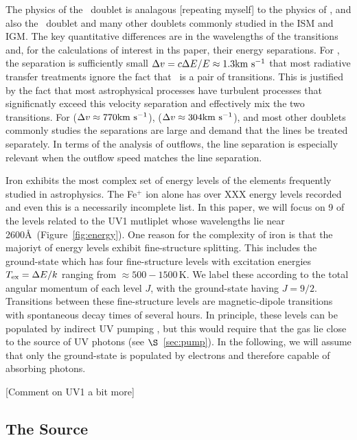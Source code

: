 \documentclass[12pt,preprint]{aastex}
\begin{document}
The physics of the \mgiid\ doublet
is analagous [repeating myself] to the physics of 
\lya, and also the \naid\ doublet and many other doublets commonly
studied in the ISM and IGM.  The key quantitative differences are in
the wavelengths of the transitions and, for the calculations of interest
in ths paper, their energy separations.  For  \lya, the
separation is sufficiently small $\Delta v = c \Delta E / E \approx 1.3
{\rm km~s^{-1}}$ that most radiative transfer treatments ignore the fact that
\lya\ is a pair of transitions.   This is justified by the fact that
most astrophysical processes have turbulent processes that
significnatly exceed this velocity separation and effectively mix the
two transitions.  For  ($\Delta v \approx 770 {\rm km~s^{-1}}$),  
 ($\Delta v \approx 304 {\rm km~s^{-1}}$), and most other doublets
commonly studies the separations are large and demand that the lines
be treated separately.  In terms of the analysis of outflows, the line
separation is especially relevant when the outflow speed matches the
line separation.

Iron exhibits the most complex set of energy levels of the elements
frequently studied in astrophysics.  The Fe$^+$ ion alone has over XXX
energy levels recorded \citep{iron} and even this is a necessarily
incomplete list.  In this paper, we will focus on 9 of the levels
related to the UV1 mutliplet whose wavelengths lie near 2600\AA\
(Figure~\ref{fig:energy}).  One reason for the complexity of iron is
that the majoriyt of energy levels exhibit fine-structure splitting.
This includes the ground-state which has four fine-structure levels with
excitation energies $T_{\rm ex} = \Delta E / k$ ranging from $\approx
500-1500$\,K.  We label these according to the total angular momentum
of each level $J$, with the ground-state having $J=9/2$.
Transitions between these fine-structure levels are magnetic-dipole
transitions with spontaneous decay times of several hours.  In
principle, these levels can be populated by indirect UV pumping
\citep[e.g][]{sv02,pcb06}, but this would require that the gas lie
close to the source of UV photons (see $\S$~\ref{sec:pump}).  In the
following, we will assume that only the ground-state is populated by
electrons and therefore capable of absorbing photons.

[Comment on UV1 a bit more]

\subsection{The Source}
\end{document}
